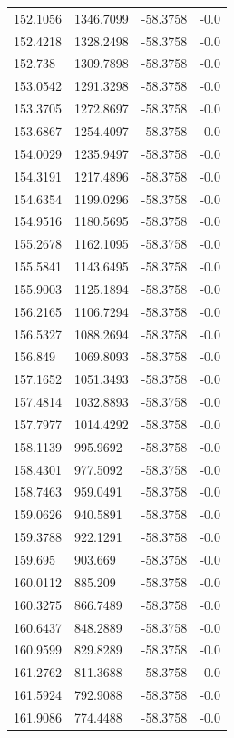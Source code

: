 \begin{table}[H]
\begin{tabular}{llll}
152.1056 & 1346.7099 & -58.3758 & -0.0 \\
152.4218 & 1328.2498 & -58.3758 & -0.0 \\
152.738 & 1309.7898 & -58.3758 & -0.0 \\
153.0542 & 1291.3298 & -58.3758 & -0.0 \\
153.3705 & 1272.8697 & -58.3758 & -0.0 \\
153.6867 & 1254.4097 & -58.3758 & -0.0 \\
154.0029 & 1235.9497 & -58.3758 & -0.0 \\
154.3191 & 1217.4896 & -58.3758 & -0.0 \\
154.6354 & 1199.0296 & -58.3758 & -0.0 \\
154.9516 & 1180.5695 & -58.3758 & -0.0 \\
155.2678 & 1162.1095 & -58.3758 & -0.0 \\
155.5841 & 1143.6495 & -58.3758 & -0.0 \\
155.9003 & 1125.1894 & -58.3758 & -0.0 \\
156.2165 & 1106.7294 & -58.3758 & -0.0 \\
156.5327 & 1088.2694 & -58.3758 & -0.0 \\
156.849 & 1069.8093 & -58.3758 & -0.0 \\
157.1652 & 1051.3493 & -58.3758 & -0.0 \\
157.4814 & 1032.8893 & -58.3758 & -0.0 \\
157.7977 & 1014.4292 & -58.3758 & -0.0 \\
158.1139 & 995.9692 & -58.3758 & -0.0 \\
158.4301 & 977.5092 & -58.3758 & -0.0 \\
158.7463 & 959.0491 & -58.3758 & -0.0 \\
159.0626 & 940.5891 & -58.3758 & -0.0 \\
159.3788 & 922.1291 & -58.3758 & -0.0 \\
159.695 & 903.669 & -58.3758 & -0.0 \\
160.0112 & 885.209 & -58.3758 & -0.0 \\
160.3275 & 866.7489 & -58.3758 & -0.0 \\
160.6437 & 848.2889 & -58.3758 & -0.0 \\
160.9599 & 829.8289 & -58.3758 & -0.0 \\
161.2762 & 811.3688 & -58.3758 & -0.0 \\
161.5924 & 792.9088 & -58.3758 & -0.0 \\
161.9086 & 774.4488 & -58.3758 & -0.0 \\

\end{tabular}
\end{table}
